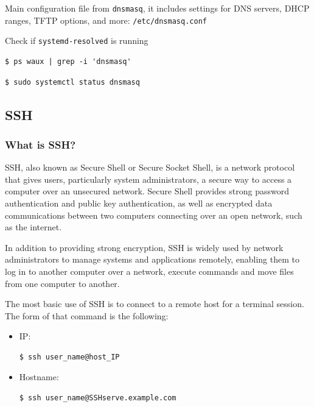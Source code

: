 \documentclass{article}
\newenvironment{codetemplate}[1][]{%
  \mybasecolorbox[#1]
  \itshape
}{%
  \endmybasecolorbox
}
\begin{document}
Main configuration file from \verb+dnsmasq+, it includes settings for DNS servers, DHCP ranges, TFTP options, and more: \verb|/etc/dnsmasq.conf|

Check if \verb|systemd-resolved| is running
\begin{codetemplate}{}
\begin{verbatim}
$ ps waux | grep -i 'dnsmasq'
\end{verbatim}
\end{codetemplate}
\begin{codetemplate}{}
\begin{verbatim}
$ sudo systemctl status dnsmasq
\end{verbatim}
\end{codetemplate}

\newpage
\subsection{SSH}

\subsubsection{What is SSH?}

SSH, also known as Secure Shell or Secure Socket Shell, is a network protocol that gives users, particularly system administrators, a secure way to access a computer over an unsecured network.  Secure Shell provides strong password authentication and public key authentication, as well as encrypted data communications between two computers connecting over an open network, such as the internet.

In addition to providing strong encryption, SSH is widely used by network administrators to manage systems and applications remotely, enabling them to log in to another computer over a network, execute commands and move files from one computer to another.


The most basic use of SSH is to connect to a remote host for a terminal session. The form of that command is the following:
\begin{itemize}
    \item IP:
\begin{codetemplate}{}
\begin{verbatim}
$ ssh user_name@host_IP
\end{verbatim}
\end{codetemplate}
    \item Hostname:
\begin{codetemplate}{}
\begin{verbatim}
$ ssh user_name@SSHserve.example.com
\end{verbatim}
\end{codetemplate}   
\end{itemize}
\end{document}
